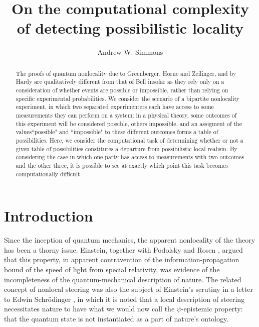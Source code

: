 \documentclass[reprint]{revtex4-1}
\theoremstyle{definition}
\begin{document}
\title{On the computational complexity of detecting possibilistic locality}
\author{Andrew W. Simmons}
\begin{abstract}
The proofs of quantum nonlocality due to Greenberger, Horne and Zeilinger, and by Hardy are qualitatively different from that of Bell insofar as they rely only on a consideration of whether events are possible or impossible, rather than relying on specific experimental probabilities. We consider the scenario of a bipartite nonlocality experiment, in which two separated experimenters each have access to some measurements they can perform on a system; in a physical theory, some outcomes of this experiment will be considered possible, others impossible, and an assigment of the values``possible" and ``impossible" to these different outcomes forms a table of possibilities. Here, we consider the computational task of determining whether or not a given table of possibilities constitutes a departure from possibilistic local realism. By considering the case in which one party has access to measurements with two outcomes and the other three, it is possible to see at exactly which point this task becomes computationally difficult.
\end{abstract}
\maketitle

\section{Introduction}
Since the inception of quantum mechanics, the apparent nonlocality of the theory has been a thorny issue. Einstein, together with Podolsky and Rosen \cite{EPR}, argued that this property, in apparent contravention of the information-propagation bound of the speed of light from special relativity, was evidence of the incompleteness of the quantum-mechanical description of nature. The related concept of nonlocal steering was also the subject of Einstein's scrutiny in a letter to Edwin Schr\"{o}dinger \cite{Eins1935-6-19}, in which it is noted that a local description of steering necessitates nature to have what we would now call the $\psi$-epistemic property: that the quantum state is not instantiated as a part of nature's ontology.
\end{document}
